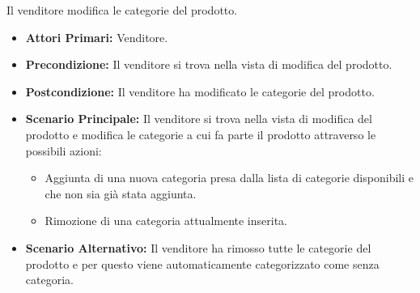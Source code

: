 Il venditore modifica le categorie del prodotto.
\begin{itemize}
    \item \textbf{Attori Primari:} Venditore.
    \item \textbf{Precondizione:} Il venditore si trova nella vista di modifica del prodotto.
    \item \textbf{Postcondizione:} Il venditore ha modificato le categorie del prodotto.
    \item \textbf{Scenario Principale:} Il venditore si trova nella vista di modifica del prodotto e modifica le categorie a cui fa parte il prodotto attraverso le possibili azioni:
    \begin{itemize}
        \item Aggiunta di una nuova categoria presa dalla lista di categorie disponibili e che non sia già stata aggiunta.
        \item Rimozione di una categoria attualmente inserita.
    \end{itemize}
    \item \textbf{Scenario Alternativo:} Il venditore ha rimosso tutte le categorie del prodotto e per questo viene automaticamente categorizzato come senza categoria.
\end{itemize}

